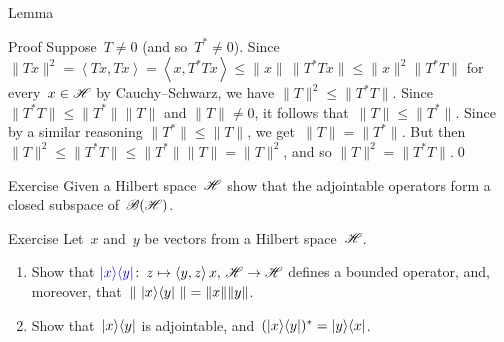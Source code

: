 \documentclass[a]{subfiles}
\begin{document}
\begin{parsec}[hilb]
\begin{point}{Lemma}
\begin{point}{Proof}
Suppose~$T\neq 0$ (and so~$T^*\neq 0$).
Since $\|Tx\|^2=\left<Tx,Tx\right>=\left<x,T^*Tx\right>
\leq \|x\|\,\|T^*Tx\|\leq \|x\|^2\|T^*T\|$
for every~$x\in \mathscr{H}$
by Cauchy--Schwarz,
we have $\|T\|^2\leq \|T^*T\|$.
Since~$\|T^*T\|\leq \|T^*\|\|T\|$
and $\|T\|\neq 0$,
it follows that~$\|T\|\leq \|T^*\|$.
Since by a similar reasoning $\|T^*\|\leq \|T\|$,
we get~$\|T\|=\|T^*\|$.
But then $\|T\|^2\leq \|T^*T\|\leq \|T^*\|\|T\|=\|T\|^2$,
and so $\|T\|^2=\|T^*T\|$.\qed
\end{point}
\end{point}
\begin{point}{Exercise}%
Given a Hilbert space~$\mathscr{H}$
show that the adjointable operators
form a closed subspace of~$\mathscr{B}(\mathscr{H})$.
\end{point}
\begin{point}[ketbra]{Exercise}%
Let~$x$ and~$y$ be vectors from a Hilbert space~$\mathscr{H}$.
\begin{enumerate}
\item
Show that $\Define{\ketbra{x}{y}}\colon\, z\mapsto\left<y,z\right>x,\,
\scrH\to\scrH$
defines a bounded operator,
and, moreover, that~$\|\,\left|x\right>\!\left<y\right|\,\|=\|x\|\|y\|$.
\item
Show that~$\left|x\right>\!\left<y\right|$
is adjointable,
and~$(\left|x\right>\!\left<y\right|)^*=\left|y\right>\!\left<x\right|$.
\end{enumerate}
\end{point}
\end{parsec}
\end{document}
